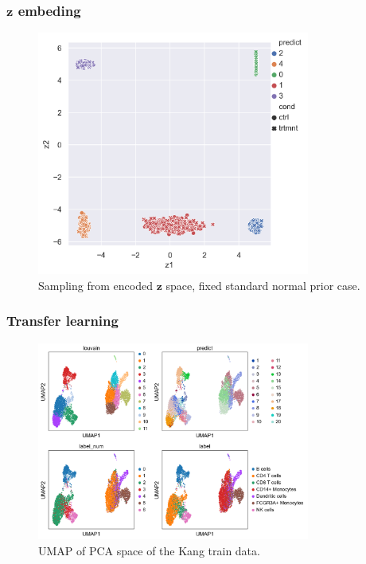\documentclass[final]{beamer}
\newcommand{\z}{\mathbf{z}}
\begin{document}
\begin{frame}
\frametitle{$\z$ embeding}
\begin{figure}[h]
\centering
\includegraphics[width=0.8\textwidth]{images/blobs_cgmvae_stdprior_z.png}
\caption{Sampling from encoded $\z$ space, fixed standard normal prior case.
}
\label{fig:blobs_nop_z}
\end{figure}
\end{frame}

\begin{frame}
\frametitle{Transfer learning}
\begin{figure}[h]
\centering
\includegraphics[width=0.8\textwidth]{images/gmmvae_Kang_control_train_us_21c_umap.png}
\caption{
UMAP of PCA space of the Kang train data. 
}
\label{fig:kang_control_train_gmvae_us_umap}
\end{figure}
\end{frame}
\end{document}
